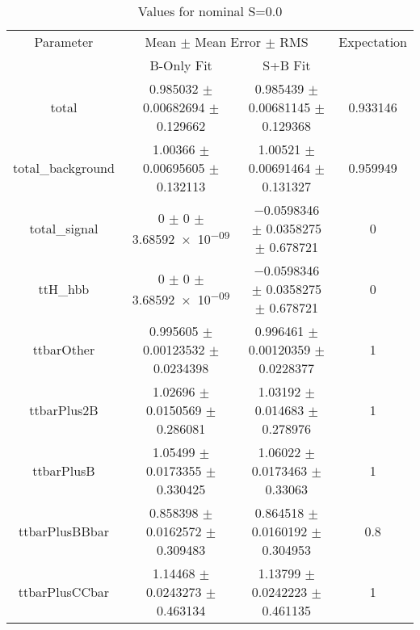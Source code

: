 \begin{table}
\centering
\caption{Values for nominal S=0.0}
\begin{tabular}{cccc}
\toprule
Parameter & \multicolumn{2}{c}{Mean $\pm$ Mean Error $\pm$ RMS} & Expectation\\
 & B-Only Fit & S+B Fit & \\
\midrule
total & \num{0.985032} $\pm$ \num{0.00682694} $\pm$ \num{0.129662} & \num{0.985439} $\pm$ \num{0.00681145} $\pm$ \num{0.129368} & \num{0.933146}\\
total\_background & \num{1.00366} $\pm$ \num{0.00695605} $\pm$ \num{0.132113} & \num{1.00521} $\pm$ \num{0.00691464} $\pm$ \num{0.131327} & \num{0.959949}\\
total\_signal & \num{0} $\pm$ \num{0} $\pm$ \num{3.68592e-09} & \num{-0.0598346} $\pm$ \num{0.0358275} $\pm$ \num{0.678721} & \num{0}\\
ttH\_hbb & \num{0} $\pm$ \num{0} $\pm$ \num{3.68592e-09} & \num{-0.0598346} $\pm$ \num{0.0358275} $\pm$ \num{0.678721} & \num{0}\\
ttbarOther & \num{0.995605} $\pm$ \num{0.00123532} $\pm$ \num{0.0234398} & \num{0.996461} $\pm$ \num{0.00120359} $\pm$ \num{0.0228377} & \num{1}\\
ttbarPlus2B & \num{1.02696} $\pm$ \num{0.0150569} $\pm$ \num{0.286081} & \num{1.03192} $\pm$ \num{0.014683} $\pm$ \num{0.278976} & \num{1}\\
ttbarPlusB & \num{1.05499} $\pm$ \num{0.0173355} $\pm$ \num{0.330425} & \num{1.06022} $\pm$ \num{0.0173463} $\pm$ \num{0.33063} & \num{1}\\
ttbarPlusBBbar & \num{0.858398} $\pm$ \num{0.0162572} $\pm$ \num{0.309483} & \num{0.864518} $\pm$ \num{0.0160192} $\pm$ \num{0.304953} & \num{0.8}\\
ttbarPlusCCbar & \num{1.14468} $\pm$ \num{0.0243273} $\pm$ \num{0.463134} & \num{1.13799} $\pm$ \num{0.0242223} $\pm$ \num{0.461135} & \num{1}\\
\bottomrule
\end{tabular}
\end{table}
